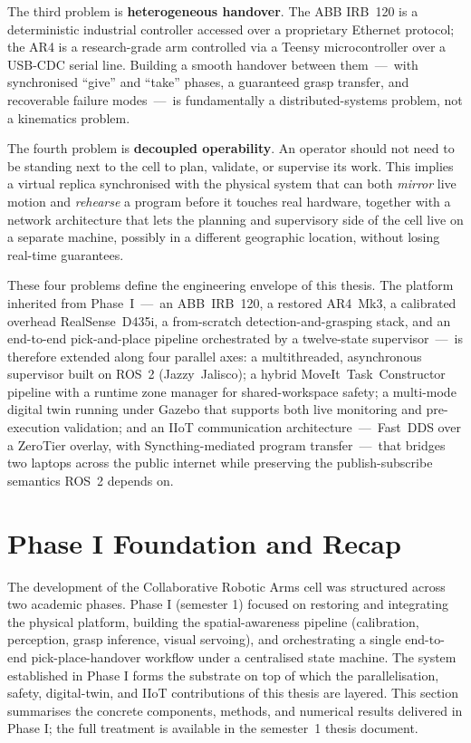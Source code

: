 The third problem is \textbf{heterogeneous handover}. The ABB IRB~120 is a deterministic industrial controller accessed over a proprietary Ethernet protocol; the AR4 is a research-grade arm controlled via a Teensy microcontroller over a USB-CDC serial line. Building a smooth handover between them~—~with synchronised ``give'' and ``take'' phases, a guaranteed grasp transfer, and recoverable failure modes~—~is fundamentally a distributed-systems problem, not a kinematics problem.

The fourth problem is \textbf{decoupled operability}. An operator should not need to be standing next to the cell to plan, validate, or supervise its work. This implies a virtual replica synchronised with the physical system that can both \emph{mirror} live motion and \emph{rehearse} a program before it touches real hardware, together with a network architecture that lets the planning and supervisory side of the cell live on a separate machine, possibly in a different geographic location, without losing real-time guarantees.

These four problems define the engineering envelope of this thesis. The platform inherited from Phase~I~—~an ABB~IRB~120, a restored AR4~Mk3, a calibrated overhead RealSense~D435i, a from-scratch detection-and-grasping stack, and an end-to-end pick-and-place pipeline orchestrated by a twelve-state supervisor~—~is therefore extended along four parallel axes: a multithreaded, asynchronous supervisor built on ROS~2 (Jazzy~Jalisco); a hybrid MoveIt~Task~Constructor pipeline with a runtime zone manager for shared-workspace safety; a multi-mode digital twin running under Gazebo that supports both live monitoring and pre-execution validation; and an IIoT communication architecture~—~Fast~DDS over a ZeroTier overlay, with Syncthing-mediated program transfer~—~that bridges two laptops across the public internet while preserving the publish-subscribe semantics ROS~2 depends on.

\section{Phase I Foundation and Recap}
\label{sec:phase1_recap}
The development of the Collaborative Robotic Arms cell was structured across two academic phases. Phase I (semester 1) focused on restoring and integrating the physical platform, building the spatial-awareness pipeline (calibration, perception, grasp inference, visual servoing), and orchestrating a single end-to-end pick-place-handover workflow under a centralised state machine. The system established in Phase I forms the substrate on top of which the parallelisation, safety, digital-twin, and IIoT contributions of this thesis are layered. This section summarises the concrete components, methods, and numerical results delivered in Phase I; the full treatment is available in the semester~1 thesis document.

